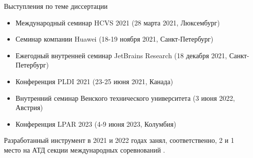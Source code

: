 \documentclass[22pt,aspectratio=169]{beamer}
\begin{document}
\begin{frame}{Выступления по теме диссертации}
\begin{itemize}
\item Международный семинар HCVS 2021 (28 марта 2021, Люксембург)
\item Семинар компании Huawei (18-19 ноября 2021, Санкт-Петербург)
\item Ежегодный внутренней семинар JetBrains Research (18 декабря 2021, Санкт-Петербург)
\item Конференция PLDI 2021 (23-25 июня 2021, Канада)
\item Внутренний семинар Венского технического университета (3 июня 2022, Австрия)
\item Конференция LPAR 2023 (4-9 июня 2023, Колумбия)
\end{itemize}

Разработанный инструмент в 2021 и 2022 годах занял, соответственно, 2 и 1 место на АТД секции международных соревнований \chccomp{}.
\end{frame}
\end{document}
